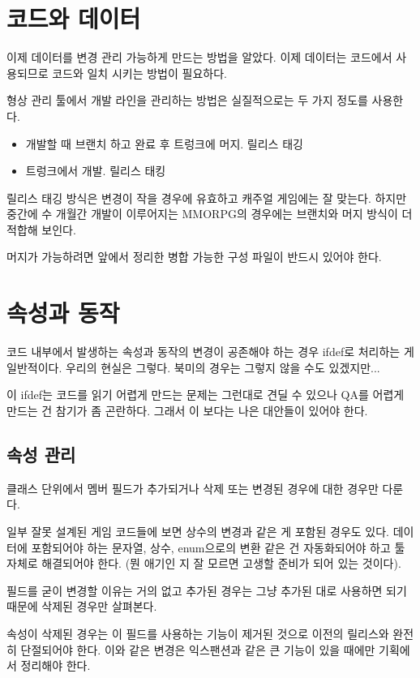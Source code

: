 \documentclass[chapter,kosection, 10.5pt, romanfixed, a4paper]{oblivoir}
\begin{document}
\section{코드와 데이터}

이제 데이터를 변경 관리 가능하게 만드는 방법을 알았다. 이제 데이터는 코드에서 사용되므로 
코드와 일치 시키는 방법이 필요하다. 

형상 관리 툴에서 개발 라인을 관리하는 방법은 실질적으로는 두 가지 정도를 사용한다. 

\begin{itemize}
\item 개발할 때 브랜치 하고 완료 후 트렁크에 머지. 릴리스 태깅
\item 트렁크에서 개발. 릴리스 태킹
\end{itemize}

릴리스 태깅 방식은 변경이 작을 경우에 유효하고 캐주얼 게임에는 잘 맞는다. 하지만 중간에 
수 개월간 개발이 이루어지는 MMORPG의 경우에는 브랜치와 머지 방식이 더 적합해 보인다. 

머지가 가능하려면 앞에서 정리한 병합 가능한 구성 파일이 반드시 있어야 한다. 

\section{속성과 동작}

코드 내부에서 발생하는 속성과 동작의 변경이 공존해야 하는 경우 ifdef로 처리하는 게 
일반적이다. 우리의 현실은 그렇다. 북미의 경우는 그렇지 않을 수도 있겠지만... 

이 ifdef는 코드를 읽기 어렵게 만드는 문제는 그런대로 견딜 수 있으나 QA를 
어렵게 만드는 건 참기가 좀 곤란하다. 그래서 이 보다는 나은 대안들이 있어야 한다.

\subsection{속성 관리}

클래스 단위에서 멤버 필드가 추가되거나 삭제 또는 변경된 경우에 대한 경우만 다룬다. 

일부 잘못 설계된 게임 코드들에 보면 상수의 변경과 같은 게 포함된 경우도 있다. 
데이터에 포함되어야 하는 문자열, 상수, enum으로의 변환 같은 건 자동화되어야 하고 
툴 자체로 해결되어야 한다. (뭔 애기인 지 잘 모르면 고생할 준비가 되어 있는 것이다). 

필드를 굳이 변경할 이유는 거의 없고 추가된 경우는 그냥 추가된 대로 사용하면 되기 때문에
삭제된 경우만 살펴본다. 

속성이 삭제된 경우는 이 필드를 사용하는 기능이 제거된 것으로 이전의 릴리스와 완전히 단절되어야 한다. 
이와 같은 변경은 익스팬션과 같은 큰 기능이 있을 때에만 기획에서 정리해야 한다. 
\end{document}
